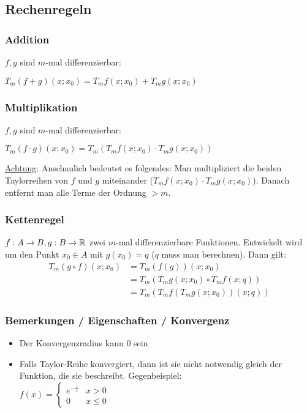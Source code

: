 \subsection{Rechenregeln}
\vspace{-0.2cm}
\subsubsection{Addition}
\vspace{-0.2cm}
{\small
$f, g$ sind $m$-mal differenzierbar:

$T_m (f + g)(x;x_0) = T_m f(x;x_0) + T_m g(x;x_0)$
}

\subsubsection{Multiplikation}
\vspace{-0.2cm}
{\small
$f, g$ sind $m$-mal differenzierbar:

$T_m (f \cdot g)(x;x_0) = T_m(T_m f(x;x_0) \cdot T_m g(x;x_0))$

\underline{Achtung}: Anschaulich bedeutet es folgendes: Man
multipliziert die beiden Taylorreihen von $f$ und $g$ miteinander ($T_m f(x;x_0) \cdot T_m g(x;x_0)$).
Danach entfernt man alle Terme der Ordnung $> m$.
}

\subsubsection{Kettenregel}
\vspace{-0.2cm}
{\small
$f: A \to B, g: B \to \mathbb{R}$ zwei $m$-mal differenzierbare Funktionen.
Entwickelt wird um den Punkt $x_0 \in A$ mit $g(x_0) = q$ ($q$ muss man berechnen).
Dann gilt:
\begin{align*}
T_m (g \circ f)(x;x_0) &= T_m (f(g))(x;x_0)\\
&= T_m(T_m g(x;x_0) \circ T_m f(x;q))\\
& = T_m(T_m f(T_m g(x;x_0))(x;q))
\end{align*}
}

\vspace{-0.5cm}
\subsubsection{Bemerkungen / Eigenschaften / Konvergenz}
\vspace{-0.2cm}
{\small
\begin{itemize}
	\item Der Konvergenzradius kann 0 sein
	\item Falls Taylor-Reihe konvergiert, dann ist sie nicht notwendig gleich
	der Funktion, die sie beschreibt. Gegenbeispiel:\\
	$f(x) = 
	\begin{cases} e^{-\frac{1}{x}} & x > 0\\
	0 & x \leq 0\end{cases}$
\end{itemize}
}